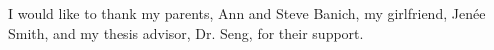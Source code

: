 \noindent
I would like to thank my parents, Ann and Steve Banich, my girlfriend, Jenée Smith, and my thesis advisor, Dr. Seng, for their support.